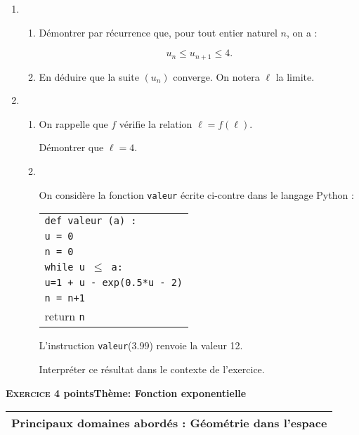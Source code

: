 \documentclass[10pt,a4paper]{article}
\begin{document}
\begin{enumerate}
\item 
	\begin{enumerate}
		\item Démontrer par récurrence que, pour tout entier naturel $n$, on a :
		
		\[u_n \leqslant u_{n+1} \leqslant 4.\]
		
		\item En déduire que la suite $\left(u_n\right)$ converge. On notera $\ell$ la limite.
	\end{enumerate}	
\item 
	\begin{enumerate}
		\item On rappelle que $f$ vérifie la relation $\ell = f(\ell)$.
		
Démontrer que $\ell  = 4$.
		\item ~
		
\begin{minipage}{0.48\linewidth}On considère la fonction \texttt{valeur} écrite ci-contre dans le langage Python :
		\end{minipage}\hfill 
\begin{minipage}{0.48\linewidth}
\begin{tabular}{|l|}\hline
\texttt{def valeur (a) :}\\
\quad \texttt{u = 0}\\
\quad \texttt{n = 0}\\
\quad \texttt{while u $\leqslant$ a:}\\
\qquad \texttt{u=1 + u - exp(0.5*u - 2)}\\
\qquad \texttt{n = n+1}\\ 
\quad return \texttt{n}\\ \hline
\end{tabular}
\end{minipage}

L'instruction \texttt{valeur}(3.99) renvoie la valeur 12.

Interpréter ce résultat dans le contexte de l'exercice.
	\end{enumerate}
\end{enumerate}

\bigskip

\textbf{\textsc{Exercice 4}  points\hfill Thème: Fonction exponentielle }

\medskip

\begin{tabularx}{\linewidth}{|X|}\hline
\textbf{Principaux domaines abordés :} Géométrie dans l'espace\\ \hline
\end{tabularx}
\end{document}
